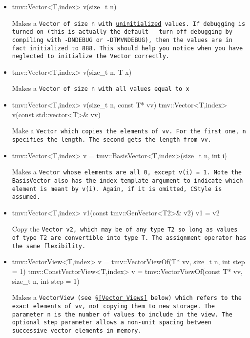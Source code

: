 \begin{itemize}
\item 
\begin{tmvcode}
tmv::Vector<T,index> v(size_t n)
\end{tmvcode}
Makes a \tt{Vector} of size \tt{n} with \underline{uninitialized} values.
If debugging is turned on (this is actually the default - 
turn off debugging by compiling
with \tt{-DNDEBUG} or \tt{-DTMVNDEBUG}), then the values are in fact initialized to 888.  
This should help you notice
when you have neglected to initialize the \tt{Vector} correctly.

\item
\begin{tmvcode}
tmv::Vector<T,index> v(size_t n, T x)
\end{tmvcode}
Makes a \tt{Vector} of size \tt{n} with all values equal to \tt{x}

\item
\begin{tmvcode}
tmv::Vector<T,index> v(size_t n, const T* vv)
tmv::Vector<T,index> v(const std::vector<T>& vv)
\end{tmvcode}
Make a \tt{Vector} which copies the elements of \tt{vv}.
For the first one, \tt{n} specifies the length.  The second gets
the length from \tt{vv}.

\item
\begin{tmvcode}
tmv::Vector<T,index> v = tmv::BasisVector<T,index>(size_t n, int i)
\end{tmvcode}
Makes a \tt{Vector} whose elements are all \tt{0}, except \tt{v(i) = 1}.
Note the \tt{BasisVector} also has the \tt{index} template argument to 
indicate which element is meant by \tt{v(i)}.  Again, if it is omitted,
\tt{CStyle} is assumed.

\item
\begin{tmvcode}
tmv::Vector<T,index> v1(const tmv::GenVector<T2>& v2)
v1 = v2
\end{tmvcode}
Copy the \tt{Vector v2}, which may be of any type \tt{T2} so long
as values of type \tt{T2} are convertible into type \tt{T}.
The assignment operator has the same flexibility.

\item
\begin{tmvcode}
tmv::VectorView<T,index> v = 
      tmv::VectorViewOf(T* vv, size_t n, int step = 1)
tmv::ConstVectorView<T,index> v = 
      tmv::VectorViewOf(const T* vv, size_t n, int step = 1)
\end{tmvcode}
Makes a \tt{VectorView} (see \S\ref{Vector_Views} below) which refers to the exact
elements of \tt{vv}, not copying them to new storage.  The parameter \tt{n}
is the number of values to include in the view.
The optional \tt{step} parameter allows a non-unit spacing between 
successive vector elements in memory. 

\end{itemize}

